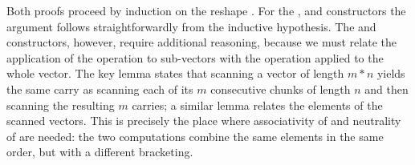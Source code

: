 Both proofs proceed by induction on the reshape .  For the ,
 and  constructors the argument follows straightforwardly from
the inductive hypothesis.  The  and  constructors, however,
require additional reasoning, because we must relate the application of the
operation to sub-vectors with the operation applied to the whole vector.
The key lemma states that scanning a vector of length $m * n$ yields the same
carry as scanning each of its $m$ consecutive chunks of length $n$ and then
scanning the resulting $m$ carries; a similar lemma relates the elements of
the scanned vectors.  This is precisely the place where associativity of
 and neutrality of  are needed: the two computations combine
the same elements in the same order, but with a different bracketing.
\begin{code}[hide]%
%
\>[2]\AgdaSpace{}%
\AgdaSpace{}%
\AgdaSpace{}%
\AgdaSymbol{=}\AgdaSpace{}%
\<%
\\
%
\>[2]\AgdaSpace{}%
\AgdaSpace{}%
\AgdaSymbol{(}\AgdaSpace{}%
\AgdaSymbol{\{}\AgdaSpace{}%
\AgdaSymbol{=}\AgdaSpace{}%
\AgdaSymbol{\}}\AgdaSpace{}%
\AgdaSpace{}%
\AgdaSymbol{)}\<%
\\
\>[2][@{}l@{\AgdaIndent{0}}]%
\>[4]\AgdaSpace{}%
\AgdaSpace{}%
\AgdaSpace{}%
\AgdaSpace{}%
\AgdaSpace{}%
\AgdaSpace{}%
\AgdaSymbol{\AgdaUnderscore{}}\AgdaSpace{}%
\AgdaSpace{}%
\AgdaSpace{}%
\AgdaSpace{}%
\AgdaSpace{}%
\AgdaSpace{}%
\AgdaSpace{}%
\AgdaSymbol{((}\AgdaSpace{}%
\AgdaSymbol{)}\AgdaSpace{}%
\AgdaSpace{}%
\AgdaSymbol{(}\AgdaSpace{}%
\AgdaSpace{}%
\AgdaSpace{}%
\AgdaSymbol{))))}\AgdaSpace{}%
\<%
\\
%
\>[4]\AgdaSymbol{=}\AgdaSpace{}%
\AgdaSpace{}%
\AgdaSymbol{\{}\AgdaSpace{}%
\AgdaSymbol{=}\AgdaSpace{}%
\AgdaSymbol{\}}\AgdaSpace{}%
\AgdaSpace{}%

\end{code}
